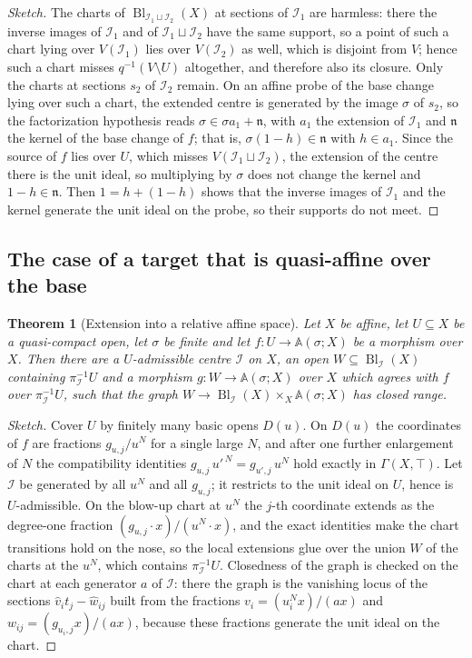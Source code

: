 \documentclass[11pt,a4paper]{article}
\theoremstyle{plain}
\newtheorem{theorem}{Theorem}[section]
\theoremstyle{definition}
\theoremstyle{remark}
\newcommand{\Bl}{\operatorname{Bl}}
\newcommand{\sI}{\mathcal{I}}
\newcommand{\Aff}{\mathbb{A}}
\begin{document}
\begin{proof}[Sketch]
The charts of $\Bl_{\sI_1\sqcup\sI_2}(X)$ at sections of $\sI_1$ are harmless:
there the inverse images of $\sI_1$ and of $\sI_1\sqcup\sI_2$ have the same
support, so a point of such a chart lying over $V(\sI_1)$ lies over $V(\sI_2)$
as well, which is disjoint from $V$; hence such a chart misses
$q^{-1}(V\setminus U)$ altogether, and therefore also its closure. Only the
charts at sections $s_2$ of $\sI_2$ remain. On an affine probe of the base
change lying over such a chart, the extended centre is generated by the image
$\sigma$ of $s_2$, so the factorization hypothesis reads $\sigma\in\sigma
a_1+\mathfrak{n}$, with $a_1$ the extension of $\sI_1$ and $\mathfrak{n}$ the
kernel of the base change of $f$; that is, $\sigma(1-h)\in\mathfrak{n}$ with
$h\in a_1$. Since the source of $f$ lies over $U$, which misses
$V(\sI_1\sqcup\sI_2)$, the extension of the centre there is the unit ideal, so
multiplying by $\sigma$ does not change the kernel and $1-h\in\mathfrak{n}$.
Then $1=h+(1-h)$ shows that the inverse images of $\sI_1$ and the kernel
generate the unit ideal on the probe, so their supports do not meet.
\end{proof}

\subsection{The case of a target that is quasi-affine over the base}

\begin{theorem}[Extension into a relative affine space]
\label{thm:conrad-case1-affine-space}
Let $X$ be affine, let $U\subseteq X$ be a quasi-compact open, let $\sigma$ be
finite and let $f\colon U\to\Aff(\sigma;X)$ be a morphism over $X$. Then there
are a $U$-admissible centre $\sI$ on $X$, an open $W\subseteq\Bl_\sI(X)$
containing $\pi_\sI^{-1}U$ and a morphism $g\colon W\to\Aff(\sigma;X)$ over $X$
which agrees with $f$ over $\pi_\sI^{-1}U$, such that the graph
$W\to\Bl_\sI(X)\times_X\Aff(\sigma;X)$ has closed range.
\end{theorem}

\begin{proof}[Sketch]
Cover $U$ by finitely many basic opens $D(u)$. On $D(u)$ the coordinates of $f$
are fractions $g_{u,j}/u^{N}$ for a single large $N$, and after one further
enlargement of $N$ the compatibility identities
$g_{u,j}\,u'^{\,N}=g_{u',j}\,u^{N}$ hold exactly in $\Gamma(X,\top)$. Let $\sI$
be generated by all $u^{N}$ and all $g_{u,j}$; it restricts to the unit ideal on
$U$, hence is $U$-admissible. On the blow-up chart at $u^{N}$ the $j$-th
coordinate extends as the degree-one fraction $(g_{u,j}\cdot x)/(u^{N}\cdot x)$,
and the exact identities make the chart transitions hold on the nose, so the
local extensions glue over the union $W$ of the charts at the $u^{N}$, which
contains $\pi_\sI^{-1}U$. Closedness of the graph is checked on the chart at
each generator $a$ of $\sI$: there the graph is the vanishing locus of the
sections $\hat v_i t_j-\hat w_{ij}$ built from the fractions
$v_i=(u_i^{N}x)/(ax)$ and $w_{ij}=(g_{u_i,j}x)/(ax)$, because these fractions
generate the unit ideal on the chart.
\end{proof}
\end{document}
